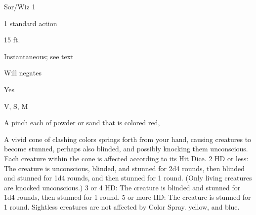 
\begin{description*}
\item[Level:] Sor/Wiz 1
\item[Casting Time:] 1 standard action
\item[Range:] 15 ft.
\item[Duration:] Instantaneous; see text
\item[Saving Throw:] Will negates
\item[Spell Resistance:] Yes
\item[Components:] V, S, M
\item[Arcane Material Component:] A pinch each of powder or sand that is colored red,
\end{description*}

A vivid cone of clashing colors springs forth from your hand, causing creatures
to become stunned, perhaps also blinded, and possibly knocking them unconscious.
Each creature within the cone is affected according to its Hit Dice.
2 HD or less: The creature is unconscious, blinded, and stunned for 2d4
rounds, then blinded and stunned for 1d4 rounds, and then stunned for 1 round.
(Only living creatures are knocked unconscious.)
3 or 4 HD: The creature is blinded and stunned for 1d4 rounds, then stunned
for 1 round.
5 or more HD: The creature is stunned for 1 round.
Sightless creatures are not affected by Color Spray.
yellow, and blue.